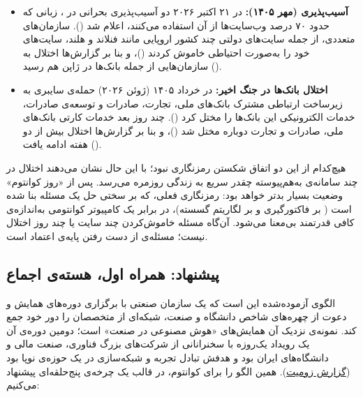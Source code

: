 \documentclass[a4paper,12pt]{article}
\begin{document}
	\begin{itemize}[rightmargin=0.5cm, itemsep=5pt]
		\item \textbf{آسیب‌پذیری  (مهر ۱۴۰۵):}
		در ۲۱ اکتبر ۲۰۲۶ دو آسیب‌پذیری بحرانی در ، زبانی که حدود ۷۰ درصد وب‌سایت‌ها از آن استفاده می‌کنند، اعلام شد
		(\href{https://www.kaspersky.com/resource-center/threats/php-critical-vulnerabilities}{}).
		سازمان‌های متعددی، از جمله سایت‌های دولتی چند کشور اروپایی مانند فنلاند و هلند، سایت‌های خود را به‌صورت احتیاطی خاموش کردند
		(\href{https://www.cbc.bb/main-stories/websites-shut-down-globally-after-ai-finds-cybersecurity-flaw/}{})،
		و بنا بر گزارش‌ها اختلال به سازمان‌هایی از جمله بانک‌ها در ژاپن هم رسید
		(\href{https://thequantumspace.org/2026/10/23/ai-found-the-flaw-the-web-went-dark/}{}).

		\item \textbf{اختلال بانک‌ها در جنگ اخیر:}
		در خرداد ۱۴۰۵ (ژوئن ۲۰۲۶) حمله‌ی سایبری به زیرساخت ارتباطی مشترک بانک‌های ملی، تجارت، صادرات و توسعه‌ی صادرات،
		خدمات الکترونیکی این بانک‌ها را مختل کرد
		(\href{https://www.aa.com.tr/en/middle-east/cyberattack-disrupts-4-banks-says-iran/3966422}{}).
		چند روز بعد خدمات کارتی بانک‌های ملی، صادرات و تجارت دوباره مختل شد
		(\href{https://arynews.tv/iran-says-card-based-banking-hit-by-cyberattack-on-three-lenders}{})،
		و بنا بر گزارش‌ها اختلال بیش از دو هفته ادامه یافت
		(\href{https://www.iranintl.news/en/202606304074}{}).
	\end{itemize}

	هیچ‌کدام از این دو اتفاق شکستن رمزنگاری نبود؛ با این حال نشان می‌دهند اختلال در چند سامانه‌ی به‌هم‌پیوسته چقدر سریع به زندگی روزمره می‌رسد.
	پس از «روز کوانتوم» وضعیت بسیار بدتر خواهد بود: رمزنگاری فعلی، که بر سختی حل یک مسئله بنا شده است
	( بر فاکتورگیری و  بر لگاریتم گسسته)، در برابر یک کامپیوتر کوانتومی به‌اندازه‌ی کافی قدرتمند بی‌معنا می‌شود.
	آن‌گاه مسئله خاموش‌کردن چند سایت یا چند روز اختلال نیست؛ مسئله‌ی از دست رفتن پایه‌ی اعتماد است.

	\subsection*{پیشنهاد: همراه اول، هسته‌ی اجماع}
	الگوی آزموده‌شده این است که یک سازمان صنعتی با برگزاری دوره‌های همایش و دعوت از چهره‌های شاخص دانشگاه و صنعت،
	شبکه‌ای از متخصصان را دور خود جمع کند. نمونه‌ی نزدیک آن همایش‌های «هوش مصنوعی در صنعت» است؛
	دومین دوره‌ی آن یک رویداد یک‌روزه با سخنرانانی از شرکت‌های بزرگ فناوری، صنعت مالی و دانشگاه‌های ایران بود
	و هدفش تبادل تجربه و شبکه‌سازی در یک حوزه‌ی نوپا بود
	(\href{https://www.zoomit.ir/tech-iran/406513-artificial-intelligence-in-indust-event/}{گزارش زومیت}).
	همین الگو را برای کوانتوم، در قالب یک چرخه‌ی پنج‌حلقه‌ای پیشنهاد می‌کنیم:
\end{document}
